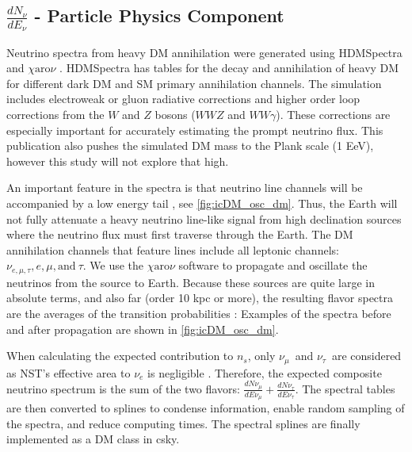 \subsection{$\frac{dN_\nu}{dE_\nu}$ - Particle Physics Component}\label{sec:icDM_particlephysics}

Neutrino spectra from heavy DM annihilation were generated using HDMSpectra \cite{HDMSpectra} and $\chi \textrm{aro}\nu$ \cite{Charon}.
HDMSpectra has tables for the decay and annihilation of heavy DM for different dark DM and SM primary annihilation channels.
The simulation includes electroweak or gluon radiative corrections and higher order loop corrections from the $W$ and $Z$ bosons ($WWZ$ and $WW\gamma$).
These corrections are especially important for accurately estimating the prompt neutrino flux.
This publication also pushes the simulated DM mass to the Plank scale (1 EeV), however this study will not explore that high.

An important feature in the spectra is that neutrino line channels will be accompanied by a low energy tail \cite{HDMSpectra}, see \cref{fig:icDM_osc_dm}.
Thus, the Earth will not fully attenuate a heavy neutrino line-like signal from high declination sources where the neutrino flux must first traverse through the Earth.
The DM annihilation channels that feature lines include all leptonic channels: $\nu_{e,\mu,\tau}, e, \mu, \mathrm{and}~\tau$.
We use the \href{https://iopscience.iop.org/article/10.1088/1475-7516/2020/10/043}{ $\chi \mathrm{aro}\nu$} software to propagate and oscillate the neutrinos from the source to Earth.
Because these sources are quite large in absolute terms, and also far (order 10 kpc or more), the resulting flavor spectra are the averages of the transition probabilities \cite{Charon}:
\nuOscMatrix
Examples of the spectra before and after propagation are shown in \cref{fig:icDM_osc_dm}.

When calculating the expected contribution to $n_s$, only $ \nu_\mu$~and $\nu_\tau$~are considered as NST's effective area to $ \nu_e $ is negligible \cite{IC3_thesis_Cerver}.
Therefore, the expected composite neutrino spectrum is the sum of the two flavors: $\frac{dN\nu_\mu}{dE\nu_\mu} + \frac{dN\nu_\tau}{dE\nu_\tau}$.
The spectral tables are then converted to splines to condense information, enable random sampling of the spectra, and reduce computing times.
The spectral splines are finally implemented as a DM class in csky.

